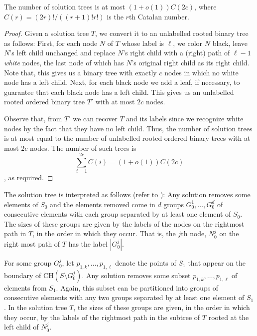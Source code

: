 \documentclass[lotsofwhite]{patmorin}
\newcommand{\ch}{\mathrm{CH}}
\begin{document}
\begin{lem}
The number of solution trees is at most $(1+o(1))C(2c)$, where
$C(r)=(2r)!/((r+1)!r!)$ is the $r$th Catalan number.
\end{lem}

\begin{proof} Given a solution tree $T$, we convert it to an
unlabelled rooted binary tree as follows: First, for each node $N$ of
$T$ whose label is $\ell$, we color $N$ black, leave $N$'s left child
unchanged and replace $N$'s right child with a (right) path of
$\ell-1$ \emph{white} nodes, the last node of which has $N$'s original
right child as its right child.  Note that, this gives us a binary
tree with exactly $c$ nodes in which no white node has a left child.
Next, for each black node we add a leaf, if necessary, to guarantee
that each black node has a left child.  This gives us an unlabelled
rooted ordered binary tree $T'$ with at most $2c$ nodes.

Observe that, from $T'$ we can recover $T$ and its labels since we
recognize white nodes by the fact that they have no left child. Thus,
the number of solution trees is at most equal to the number of
unlabelled rooted ordered binary trees with at most $2c$ nodes.  The
number of such trees is 
\[
  \sum_{i=1}^{2c} C(i) = (1+o(1))C(2c)
\]
\cite{knuth-graham-patashnik},
as required.
\end{proof}


The solution tree is interpreted as follows (refer to
): Any solution removes some elements of $S_0$
and the elements removed come in $d$ groups $G_0^1,\ldots,G_0^d$ of
consecutive elements with each group separated by at least one element
of $S_0$.  The sizes of these groups are given by the labels of the
nodes on the rightmost path in $T$, in the order in which they occur.
That is, the $j$th node, $N_0^j$ on the right most path of $T$ has the
label $|G_0^j|$. 

For some group $G_0^j$, let $p_{1,k}, \ldots, p_{1,\ell}$ denote the
points of $S_1$ that appear on the boundary of $\ch(S\setminus
G_0^j)$.  Any solution removes some subset $p_{1,k},\ldots,
p_{1,\ell}$ of elements from $S_1$.  Again, this subset can be
partitioned into groups of consecutive elements with any two groups
separated by at least one element of $S_1$.  In the solution tree $T$,
the sizes of these groups are given, in the order in which they occur,
by the labels of the rightmost path in the subtree of $T$ rooted at
the left child of $N_0^j$.
\end{document}
